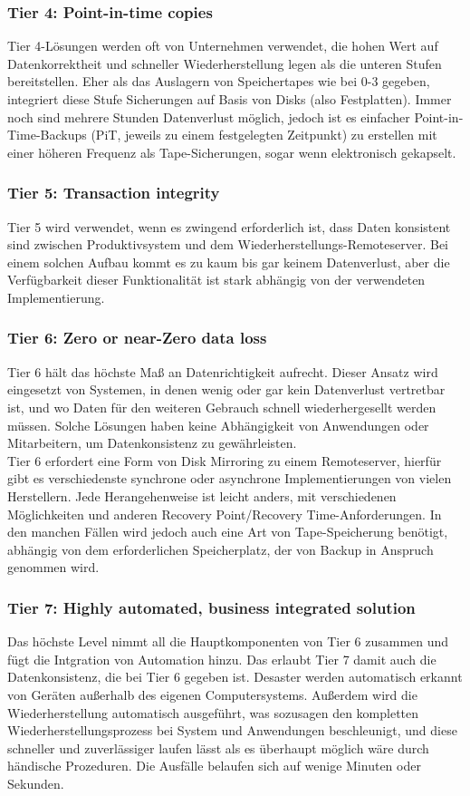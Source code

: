 \documentclass[letterpaper, 12pt]{article}
\let\tempsubsubsection\subsubsection
\renewcommand\subsubsection[1]{\vspace{0cm}\tempsubsubsection{#1}\vspace{0cm}}
\begin{document}
	\subsubsection{Tier 4: Point-in-time copies}
	Tier 4-Lösungen werden oft von Unternehmen verwendet, die hohen Wert auf Datenkorrektheit und schneller Wiederherstellung legen als die unteren Stufen bereitstellen. Eher als das Auslagern von Speichertapes wie bei 0-3 gegeben, integriert diese Stufe Sicherungen auf Basis von Disks (also Festplatten). Immer noch sind mehrere Stunden Datenverlust möglich, jedoch ist es einfacher Point-in-Time-Backups (PiT, jeweils zu einem festgelegten Zeitpunkt) zu erstellen mit einer höheren Frequenz als Tape-Sicherungen, sogar wenn elektronisch gekapselt.
	\subsubsection{Tier 5: Transaction integrity} 
	Tier 5 wird verwendet, wenn es zwingend erforderlich ist, dass Daten konsistent sind zwischen Produktivsystem und dem Wiederherstellungs-Remoteserver. Bei einem solchen Aufbau kommt es zu kaum bis gar keinem Datenverlust, aber die Verfügbarkeit dieser Funktionalität ist stark abhängig von der verwendeten Implementierung.
	\subsubsection{Tier 6: Zero or near-Zero data loss} 
	Tier 6 hält das höchste Maß an Datenrichtigkeit aufrecht. Dieser Ansatz wird eingesetzt von Systemen, in denen wenig oder gar kein Datenverlust vertretbar ist, und wo Daten für den weiteren Gebrauch schnell wiederhergesellt werden müssen. Solche Lösungen haben keine Abhängigkeit von Anwendungen oder Mitarbeitern, um Datenkonsistenz zu gewährleisten. \\
	Tier 6 erfordert eine Form von Disk Mirroring zu einem Remoteserver, hierfür gibt es verschiedenste synchrone oder asynchrone Implementierungen von vielen Herstellern. Jede Herangehenweise ist leicht anders, mit verschiedenen Möglichkeiten und anderen Recovery Point/Recovery Time-Anforderungen. In den manchen Fällen wird jedoch auch eine Art von Tape-Speicherung benötigt, abhängig von dem erforderlichen Speicherplatz, der von Backup in Anspruch genommen wird.
	\subsubsection{Tier 7: Highly automated, business integrated solution} 
	Das höchste Level nimmt all die Hauptkomponenten von Tier 6 zusammen und fügt die Intgration von Automation hinzu. Das erlaubt Tier 7 damit auch die Datenkonsistenz, die bei Tier 6 gegeben ist. Desaster werden automatisch erkannt von Geräten außerhalb des eigenen Computersystems. Außerdem wird die Wiederherstellung automatisch ausgeführt, was sozusagen den kompletten Wiederherstellungsprozess bei System und Anwendungen beschleunigt, und diese schneller und zuverlässiger laufen lässt als es überhaupt möglich wäre durch händische Prozeduren. Die Ausfälle belaufen sich auf wenige Minuten oder Sekunden.
	
\end{document}
